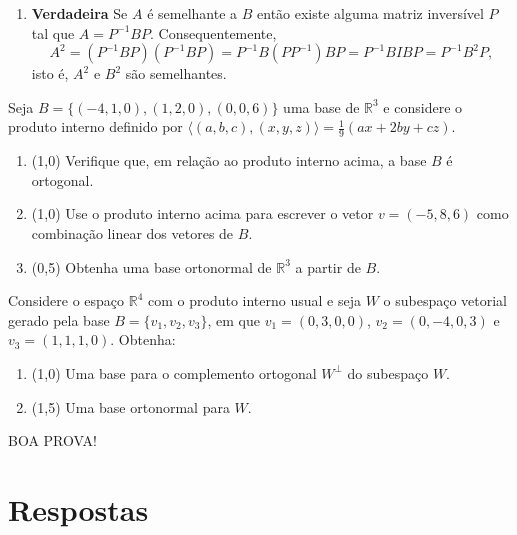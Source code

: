 \documentclass[12pt,a4paper]{article}
\newcommand{\fixme}{{\color{red}(...)}}
\newcommand*\R{\mathbb{R}}
\begin{document}
\begin{ExerciseList}
\begin{enumerate}
\item \textbf{Verdadeira} Se $A$ é semelhante a $B$ então existe alguma matriz inversível $P$ tal que $A = P^{-1} B P$. Consequentemente,
\[
A^2 = (P^{-1} B P)(P^{-1} B P)
    = P^{-1} B (PP^{-1}) B P
    = P^{-1} B I B P
    = P^{-1} B^2 P,
\]
isto é, $A^2$ e $B^2$ são semelhantes.
\end{enumerate}


\Exercise[title={2,5}] Seja
$B = \{ (-4, 1, 0), (1, 2, 0), (0, 0, 6) \}$
uma base de $\R^3$ e considere o produto interno definido por $\langle (a, b, c), (x,y,z) \rangle = \frac{1}{9}(ax+2by+cz)$.
\begin{enumerate}
\item (1,0) Verifique que, em relação ao produto interno acima, a base $B$ é ortogonal.
\item (1,0) Use o produto interno acima para escrever o vetor $v = (-5, 8, 6)$ como combinação linear dos vetores de $B$.
\item (0,5) Obtenha uma base ortonormal de $\R^3$ a partir de $B$.
\end{enumerate}
\Answer \fixme


\Exercise[title={2,5}] Considere o espaço $\R^4$ com o produto interno usual e seja $W$ o subespaço vetorial gerado pela base $B = \{ v_1, v_2, v_3\}$, em que $v_1 = (0,3,0,0)$, $v_2 = (0,-4,0,3)$ e $v_3 = (1,1,1,0)$. Obtenha:
\begin{enumerate}
\item (1,0) Uma base para o complemento ortogonal $W^\perp$ do subespaço $W$.
\item (1,5) Uma base ortonormal para $W$.
\end{enumerate}
\Answer \fixme
\end{ExerciseList}

\begin{center}
BOA PROVA!
\end{center}

\newpage
\restoregeometry
\section*{Respostas}
\shipoutAnswer
\end{document}
